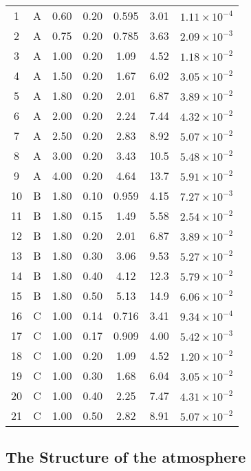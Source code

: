\documentclass[journal, onecolumn]{aastex631}
\begin{document}
\begin{CJK*}{UTF8}{gbsn}
\begin{table}[!t]
\begin{center}
\begin{threeparttable}[t]
\begin{tabular}{ccccccc}
\midrule
  1&A& 0.60& 0.20& 0.595& 3.01& $1.11\times 10^{-4}$\\
  2&A& 0.75& 0.20& 0.785& 3.63& $2.09\times 10^{-3}$\\
  3&A& 1.00& 0.20& 1.09& 4.52& $1.18\times 10^{-2}$\\
  4&A& 1.50& 0.20& 1.67& 6.02& $3.05\times 10^{-2}$\\
  5&A& 1.80& 0.20& 2.01& 6.87& $3.89\times 10^{-2}$\\
  6&A& 2.00& 0.20& 2.24& 7.44& $4.32\times 10^{-2}$\\
  7&A& 2.50& 0.20& 2.83& 8.92& $5.07\times 10^{-2}$\\
  8&A& 3.00& 0.20& 3.43& 10.5& $5.48\times 10^{-2}$\\
  9&A& 4.00& 0.20& 4.64& 13.7& $5.91\times 10^{-2}$\\
\hline
  10&B& 1.80& 0.10& 0.959& 4.15& $7.27\times 10^{-3}$\\
  11&B& 1.80& 0.15& 1.49& 5.58& $2.54\times 10^{-2}$\\
  12&B& 1.80& 0.20& 2.01& 6.87& $3.89\times 10^{-2}$\\
  13&B& 1.80& 0.30& 3.06& 9.53& $5.27\times 10^{-2}$\\
  14&B& 1.80& 0.40& 4.12& 12.3& $5.79\times 10^{-2}$\\
  15&B& 1.80& 0.50& 5.13& 14.9& $6.06\times 10^{-2}$\\
\hline
  16&C& 1.00& 0.14& 0.716& 3.41& $9.34\times 10^{-4}$\\
  17&C& 1.00& 0.17& 0.909& 4.00& $5.42\times 10^{-3}$\\
  18&C& 1.00& 0.20& 1.09& 4.52& $1.20\times 10^{-2}$\\
  19&C& 1.00& 0.30& 1.68& 6.04& $3.05\times 10^{-2}$\\
  20&C& 1.00& 0.40& 2.25& 7.47& $4.31\times 10^{-2}$\\
  21&C& 1.00& 0.50& 2.82& 8.91& $5.07\times 10^{-2}$\\
\bottomrule

\end{tabular}\label{tab:model_para}
\end{threeparttable}
\end{center}
\end{table}

\subsection{The Structure of the atmosphere}\label{subsec:atmosphere}




\end{CJK*}
\end{document}
